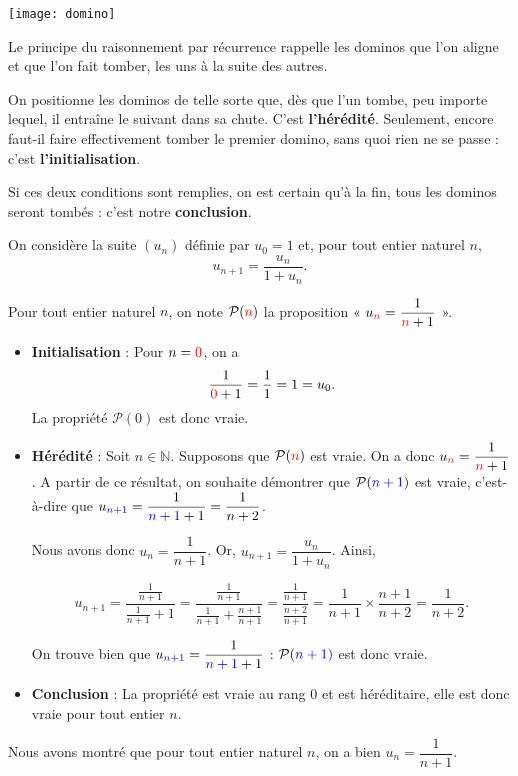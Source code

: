 \documentclass[11pt,fleqn]{book} %
\begin{document}
\begin{minipage}{0.15\linewidth}
\begin{center}
\texttt{[image: domino]}
\end{center}
\end{minipage}\hfill\begin{minipage}{0.78\linewidth}
Le principe du raisonnement par récurrence rappelle les dominos que l'on aligne et que l'on fait tomber, les uns à la suite des autres.

\vskip5pt
On positionne les dominos de telle sorte que, dès que l'un tombe, peu importe lequel, il entraîne le suivant dans sa chute. C'est \textbf{l'hérédité}. Seulement, encore faut-il faire effectivement tomber le premier domino, sans quoi rien ne se passe : c'est \textbf{l'initialisation}.

\vskip5pt
Si ces deux conditions sont remplies, on est certain qu'à la fin, tous les dominos seront tombés : c'est notre \textbf{conclusion}.\end{minipage}

\newpage
\begin{example}
On considère la suite \((u_n)\) définie par \(u_0=1\) et, pour tout entier naturel \(n\), \[u_{n+1}=\dfrac{u_n}{1+u_n}.\]

Pour tout entier naturel $n$, on note \(\mathcal{P}(\color{red}n\color{black})\) la proposition  « \(u_{\color{red}n}=\dfrac{1}{\color{red}n\color{black}+1}\) ».
\begin{itemize}
\item \textbf{Initialisation} : Pour \(n=\color{red}0\), on a \[\dfrac{1}{\color{red}0\color{black}+1}=\dfrac{1}{1}=1=u_0.\] La propriété $\mathcal{P}(0)$ est donc vraie.
\item \textbf{Hérédité} : Soit \(n\in\mathbb{N}\). Supposons que \(\mathcal{P}(\color{red}n\color{black})\) est vraie. On a donc \(u_{\color{red}n} = \dfrac{1}{\color{red}n\color{black}+1}\). A partir de ce résultat, on souhaite démontrer que \(\mathcal{P}(\color{blue}{n+1}\color{black})\) est vraie, c'est-à-dire que \(u_{\color{blue}{n+1}}=\dfrac{1}{\color{blue}{n+1}\color{black}+1}=\dfrac{1}{n+2}\).

Nous avons donc \( u_n = \dfrac{1}{n+1}\). Or, \(u_{n+1} = \dfrac{u_n}{1+u_n}\). Ainsi,

\[ u_{n+1} = \dfrac{\frac{1}{n+1}}{\frac{1}{n+1}+1}=\dfrac{\frac{1}{n+1}}{\frac{1}{n+1}+\frac{n+1}{n+1}}=\dfrac{\frac{1}{n+1}}{\frac{n+2}{n+1}}=\dfrac{1}{n+1} \times \dfrac{n+1}{n+2}=\dfrac{1}{n+2}. \]

On trouve bien que \(u_{\color{blue}{n+1}}=\dfrac{1}{\color{blue}{n+1}\color{black}+1}\) : \( \mathcal{P}( \color{blue}{n+1})\) est donc vraie.
\item \textbf{Conclusion} : La propriété est vraie au rang 0 et est héréditaire, elle est donc vraie pour tout entier \(n\).\end{itemize}
Nous avons montré que pour tout entier naturel \(n\), on a bien \(u_n= \dfrac{1}{n+1}\).\end{example}
\end{document}
